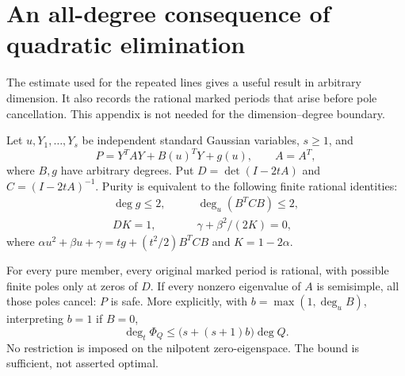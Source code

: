 \section{An all-degree consequence of quadratic elimination}
\label{sec:constantfibres}

The estimate used for the repeated lines gives a useful result
in arbitrary dimension. It also records the rational marked periods that arise before pole
cancellation. This appendix is not needed for the dimension--degree
boundary.

\begin{theorem}\label{thm:constantfibres}
Let $u,Y_1,\ldots,Y_s$ be independent standard Gaussian variables,
$s\ge1$, and
\[
 P=Y^TAY+B(u)^TY+g(u),\qquad A=A^T,
\]
where $B,g$ have arbitrary degrees. Put $D=\det(I-2tA)$ and
$C=(I-2tA)^{-1}$. Purity is equivalent to the following finite
rational identities:
\begin{align}
 \deg g\le2,\qquad &\deg_u(B^TCB)\le2,\label{eq:fibredegree}\\
 D K=1,\qquad &\gamma+\beta^2/(2K)=0,\label{eq:fibreunit}
\end{align}
where $\alpha u^2+\beta u+\gamma=tg+(t^2/2)B^TCB$ and
$K=1-2\alpha$.

For every pure member, every original marked period is rational,
with possible finite poles only at zeros of $D$. If every
nonzero eigenvalue of $A$ is semisimple, all those poles cancel:
$P$ is safe. More explicitly, with
$b=\max(1,\deg_u B)$, interpreting $b=1$ if $B=0$,
\begin{equation}\label{eq:fibrecutoff}
 \deg_t\Phi_Q\le\bigl(s+(s+1)b\bigr)\deg Q.
\end{equation}
No restriction is imposed on the nilpotent zero-eigenspace.
The bound is sufficient, not asserted optimal.
\end{theorem}
